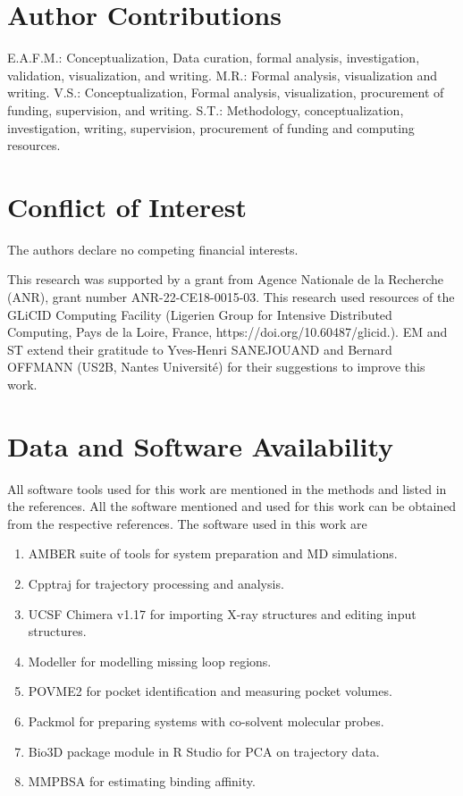 \documentclass[12pt,a4paper]{achemso}
\begin{document}
\section{Author Contributions}
E.A.F.M.: Conceptualization, Data curation, formal analysis, investigation,
validation, visualization, and writing. 
M.R.: Formal analysis, visualization and writing. 
V.S.: Conceptualization, Formal analysis,  visualization, procurement of funding, supervision, and writing. 
S.T.: Methodology, conceptualization, investigation, writing, supervision, procurement of funding and computing resources.

\section{Conflict of Interest}
The authors declare no competing financial interests.

\begin{acknowledgement}
This research was supported by a grant from Agence Nationale de la Recherche (ANR), grant number ANR-22-CE18-0015-03. This research used resources of the GLiCID Computing Facility (Ligerien Group for Intensive Distributed Computing, Pays de la Loire, France, https://doi.org/10.60487/glicid.). EM and ST extend their gratitude to Yves-Henri SANEJOUAND and Bernard OFFMANN (US2B, Nantes Université) for their suggestions to improve this work. 
\end{acknowledgement}

\section{Data and Software Availability}
All software tools used for this work are mentioned in the methods and listed in the references. All the software mentioned and used for this work can be obtained from the respective references. 
The software used in this work are 
\begin{enumerate}
\item AMBER suite of tools\cite{pmemd01,pmemd02,pmemd03,amber22,amber} for system preparation and MD simulations.
\item Cpptraj\cite{cpptraj} for trajectory processing and analysis.
\item UCSF Chimera v1.17 \cite{pettersen2004ucsf} for importing X-ray structures and editing input structures.
\item  Modeller \cite{fiser2003modeller} for modelling missing loop regions. 
\item POVME2 \cite{durrant2011povme, durrant2014povme} for pocket identification and measuring pocket volumes. 
\item Packmol \cite{martinez2009packmol} for preparing systems with co-solvent molecular probes.
\item Bio3D package\cite{bio3d} module in R Studio for PCA on trajectory data. 
\item MMPBSA \cite{mmpbsa} for estimating binding affinity. 
\end{enumerate}
\end{document}
